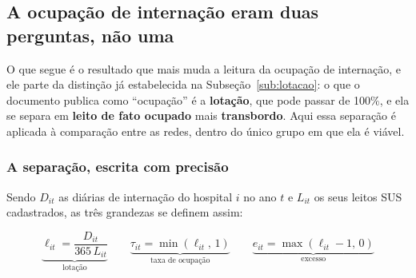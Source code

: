 
\subsection{A ocupação de internação eram duas perguntas, não uma}
\label{sub:decomposicao}

O que segue é o resultado que mais muda a leitura da ocupação de internação,
e ele parte da distinção já estabelecida na
Subseção~\ref{sub:lotacao}: o que o documento publica como ``ocupação'' é a
\textbf{lotação}, que pode passar de 100\%, e ela se separa em \textbf{leito
de fato ocupado} mais \textbf{transbordo}. Aqui essa separação é aplicada à
comparação entre as redes, dentro do único grupo em que ela é viável.

\subsubsection*{A separação, escrita com precisão}

Sendo $D_{it}$ as diárias de internação do hospital $i$ no ano $t$ e
$L_{it}$ os seus leitos SUS cadastrados, as três grandezas se definem assim:

\begin{equation*}
  \underbrace{\ell_{it} = \frac{D_{it}}{365\,L_{it}}}_{\text{lotação}}
  \qquad
  \underbrace{\tau_{it} = \min(\ell_{it},\,1)}_{\text{taxa de ocupação}}
  \qquad
  \underbrace{e_{it} = \max(\ell_{it}-1,\,0)}_{\text{excesso}}
\end{equation*}

